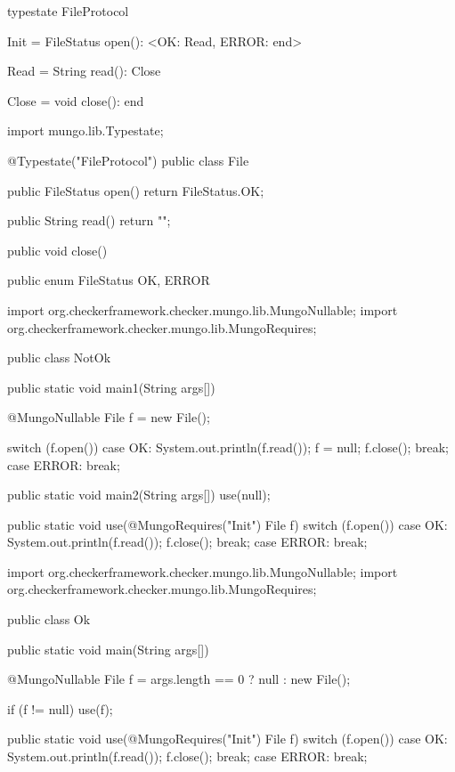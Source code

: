 \begin{code}
typestate FileProtocol {

  Init = {
    FileStatus open(): <OK: Read, ERROR: end>
  }

  Read = {
    String read(): Close
  }

  Close = {
    void close(): end
  }

}\end{code}

\begin{code}
import mungo.lib.Typestate;

@Typestate("FileProtocol")
public class File {

  public FileStatus open() {
    return FileStatus.OK;
  }

  public String read() {
    return "";
  }

  public void close() {

  }

}\end{code}

\begin{code}
public enum FileStatus {
  OK, ERROR
}\end{code}

\begin{code}
import org.checkerframework.checker.mungo.lib.MungoNullable;
import org.checkerframework.checker.mungo.lib.MungoRequires;

public class NotOk {
  public static void main1(String args[]) {
    @MungoNullable File f = new File();

    switch (f.open()) {
      case OK:
        System.out.println(f.read());
        f = null;
        f.close();
        break;
      case ERROR:
        break;
    }
  }

  public static void main2(String args[]) {
    use(null);
  }

  public static void use(@MungoRequires("Init") File f) {
    switch (f.open()) {
      case OK:
        System.out.println(f.read());
        f.close();
        break;
      case ERROR:
        break;
    }
  }
}\end{code}

\begin{code}
import org.checkerframework.checker.mungo.lib.MungoNullable;
import org.checkerframework.checker.mungo.lib.MungoRequires;

public class Ok {
  public static void main(String args[]) {
    @MungoNullable File f = args.length == 0 ? null : new File();

    if (f != null) {
      use(f);
    }
  }

  public static void use(@MungoRequires("Init") File f) {
    switch (f.open()) {
      case OK:
        System.out.println(f.read());
        f.close();
        break;
      case ERROR:
        break;
    }
  }
}\end{code}

